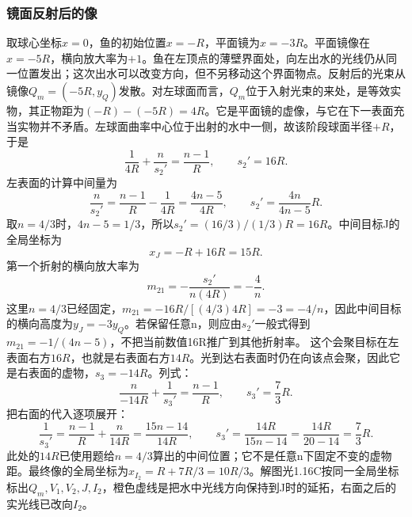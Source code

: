 \documentclass[UTF8,fontset=fandol,a4paper,11pt]{ctexart}
\begin{document}
\subsubsection*{镜面反射后的像}
取球心坐标$x=0$，鱼的初始位置$x=-R$，平面镜为$x=-3R$。平面镜像在$x=-5R$，横向放大率为$+1$。鱼在左顶点的薄壁界面处，向左出水的光线仍从同一位置发出；这次出水可以改变方向，但不另移动这个界面物点。反射后的光束从镜像$Q_m=(-5R,y_Q)$发散。对左球面而言，$Q_m$位于入射光束的来处，是等效实物，其正物距为$(-R)-(-5R)=4R$。它是平面镜的虚像，与它在下一表面充当实物并不矛盾。左球面曲率中心位于出射的水中一侧，故该阶段球面半径$+R$，于是
\[
\frac1{4R}+\frac n{s_2'}=\frac{n-1}{R},
\qquad
\boxed{s_2'=16R}.
\]
左表面的计算中间量为
\[
\frac n{s_2'}=\frac{n-1}{R}-\frac1{4R}
=\frac{4n-5}{4R},\qquad
s_2'=\frac{4n}{4n-5}R.
\]
取$n=4/3$时，$4n-5=1/3$，所以$s_2'=(16/3)/(1/3)R=16R$。中间目标J的全局坐标为
\[
x_J=-R+16R=15R.
\]
第一个折射的横向放大率为
\[
m_{21}=-\frac{s_2'}{n(4R)}=-\frac4n.
\]
这里$n=4/3$已经固定，$m_{21}=-16R/[(4/3)4R]=-3=-4/n$，因此中间目标的横向高度为$y_J=-3y_Q$。若保留任意n，则应由$s_2'$一般式得到$m_{21}=-1/(4n-5)$，不把当前数值16R推广到其他折射率。
这个会聚目标在左表面右方$16R$，也就是右表面右方$14R$。光到达右表面时仍在向该点会聚，因此它是右表面的虚物，$s_3=-14R$。列式：
\[
\frac n{-14R}+\frac1{s_3'}=\frac{n-1}{R},
\qquad
\boxed{s_3'=\frac73R}.
\]
把右面的代入逐项展开：
\[
\frac1{s_3'}=\frac{n-1}{R}+\frac n{14R}
=\frac{15n-14}{14R},\qquad
s_3'=\frac{14R}{15n-14}
=\frac{14R}{20-14}=\frac73R.
\]
此处的$14R$已使用题给$n=4/3$算出的中间位置；它不是任意n下固定不变的虚物距。最终像的全局坐标为$x_{I_2}=R+7R/3=10R/3$。解图光1.16C按同一全局坐标标出$Q_m,V_1,V_2,J,I_2$，橙色虚线是把水中光线方向保持到J时的延拓，右面之后的实光线已改向$I_2$。
\end{document}
